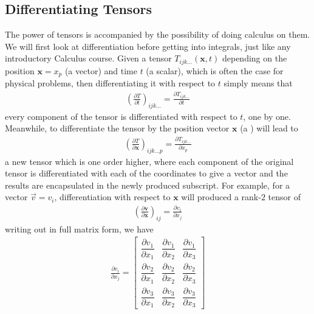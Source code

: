 \subsection{Differentiating Tensors}

The power of tensors is accompanied by the possibility of doing calculus on them. We will first look at differentiation before getting into integrals, just like any introductory Calculus course. Given a tensor $T_{ijk\ldots}(\textbf{x}, t)$ depending on the position $\textbf{x} = x_p$ (a vector) and time $t$ (a scalar), which is often the case for physical problems, then differentiating it with respect to $t$ simply means that
\begin{align}
\left(\frac{\partial T}{\partial t}\right)_{ijk\ldots} = \frac{\partial T_{ijk\ldots}}{\partial t}
\end{align}
every component of the tensor is differentiated with respect to $t$, one by one. Meanwhile, to differentiate the tensor by the position vector $\textbf{x}$ (a ) will lead to
\begin{align}
\left(\frac{\partial T}{\partial \textbf{x}}\right)_{ijk\ldots p} = \frac{\partial T_{ijk\ldots}}{\partial x_p}
\end{align}
a new tensor which is one order higher, where each component of the original tensor is differentiated with each of the coordinates to give a vector and the results are encapsulated in the newly produced subscript. For example, for a vector $\vec{v} = v_i$, differentiation with respect to $\textbf{x}$ will produced a rank-$2$ tensor of
\begin{align}
\left(\frac{\partial \textbf{v}}{\partial \textbf{x}}\right)_{ij} = \frac{\partial v_i}{\partial x_j} \label{eqn:vectortensdiff}
\end{align}
writing out in full matrix form, we have
\begin{align}
\frac{\partial v_i}{\partial x_j} = 
\begin{bmatrix}
\dfrac{\partial v_1}{\partial x_1} & \dfrac{\partial v_1}{\partial x_2} & \dfrac{\partial v_1}{\partial x_3} \\[10pt]
\dfrac{\partial v_2}{\partial x_1} & \dfrac{\partial v_2}{\partial x_2} & \dfrac{\partial v_2}{\partial x_3} \\[10pt]
\dfrac{\partial v_3}{\partial x_1} & \dfrac{\partial v_3}{\partial x_2} & \dfrac{\partial v_3}{\partial x_3} 
\end{bmatrix}
\end{align}
